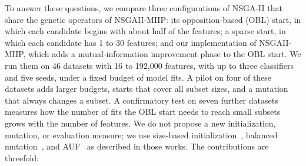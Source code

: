 To answer these questions, we compare three configurations of NSGA-II that share the genetic operators of NSGAII-MIIP: its opposition-based (OBL) start, in which each candidate begins with about half of the features; a sparse start, in which each candidate has 1 to 30 features; and our implementation of NSGAII-MIIP, which adds a mutual-information improvement phase to the OBL start. We run them on 46 datasets with 16 to 192{,}000 features, with up to three classifiers and five seeds, under a fixed budget of model fits. A pilot on four of these datasets adds larger budgets, starts that cover all subset sizes, and a mutation that always changes a subset. A confirmatory test on seven further datasets measures how the number of fits the OBL start needs to reach small subsets grows with the number of features. We do not propose a new initialization, mutation, or evaluation measure; we use size-based initialization~\cite{Miyandoab2024}, balanced mutation~\cite{Oh2004,Li2025}, and AUF~\cite{Koprivec2020} as described in those works. The contributions are threefold:
